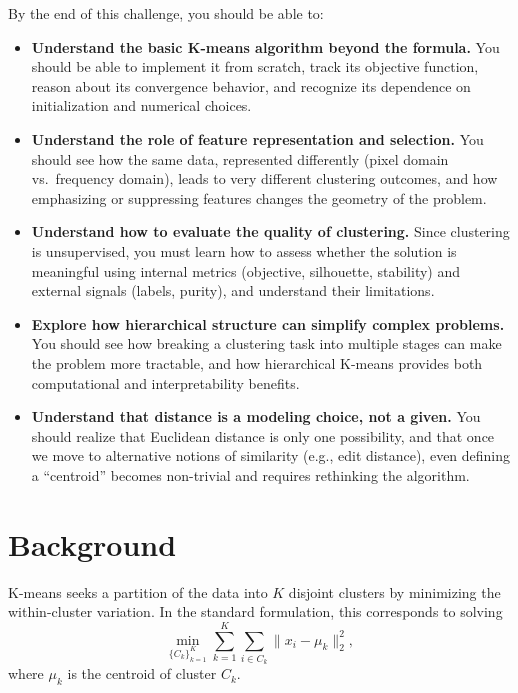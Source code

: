 \documentclass[11pt]{article}
\begin{document}
By the end of this challenge, you should be able to:
\begin{itemize}[itemsep=3pt]

    \item \textbf{Understand the basic K-means algorithm beyond the formula.}  
    You should be able to implement it from scratch, track its objective function, reason about its convergence behavior, and recognize its dependence on initialization and numerical choices.

    \item \textbf{Understand the role of feature representation and selection.}  
    You should see how the same data, represented differently (pixel domain vs.\ frequency domain), leads to very different clustering outcomes, and how emphasizing or suppressing features changes the geometry of the problem.

    \item \textbf{Understand how to evaluate the quality of clustering.}  
    Since clustering is unsupervised, you must learn how to assess whether the solution is meaningful using internal metrics (objective, silhouette, stability) and external signals (labels, purity), and understand their limitations.

    \item \textbf{Explore how hierarchical structure can simplify complex problems.}  
    You should see how breaking a clustering task into multiple stages can make the problem more tractable, and how hierarchical K-means provides both computational and interpretability benefits.

    \item \textbf{Understand that distance is a modeling choice, not a given.}  
    You should realize that Euclidean distance is only one possibility, and that once we move to alternative notions of similarity (e.g., edit distance), even defining a “centroid” becomes non-trivial and requires rethinking the algorithm.

\end{itemize}

\section*{Background}

K-means seeks a partition of the data into \(K\) disjoint clusters by minimizing the within-cluster variation. In the standard formulation, this corresponds to solving
\[
\min_{\{C_k\}_{k=1}^K} \sum_{k=1}^K \sum_{i \in C_k} \|x_i - \mu_k\|_2^2,
\]
where \(\mu_k\) is the centroid of cluster \(C_k\).
\end{document}
